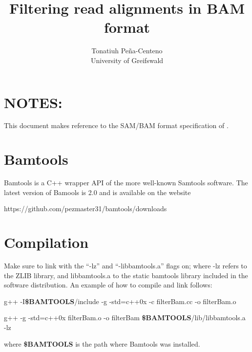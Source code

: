 \documentclass[11pt]{article}
\begin{document}
  
\title{Filtering read alignments in BAM format} 
\author{Tonatiuh Pe\~{n}a-Centeno \\
University of Greifswald}
\renewcommand{\today}{15 November, 2011}
\maketitle
{}

\section{NOTES:} 
This document makes reference to the SAM/BAM format specification of \cite{heng09}.

\section{Bamtools}
Bamtools is a C++ wrapper API of the more well-known Samtools software. The latest version of Bamools 
is 2.0 and is available on the website 
	\begin{center}
		https://github.com/pezmaster31/bamtools/downloads
	\end{center}
\item 


\section{Compilation}
Make sure to link with the ``-lz'' and ``-libbamtools.a'' flags on; where -lz refers to the ZLIB library, 
and libbamtools.a to the static bamtools library included in the software distribution. An example of 
how to compile and link follows: 

\begin{enumerate}
\begin{flushleft}
	\item	
		g++ -I\textbf{\$BAMTOOLS}/include   -g   -std=c++0x  -c filterBam.cc -o filterBam.o \\
	\item	g++     -g -std=c++0x  filterBam.o -o filterBam \textbf{\$BAMTOOLS}/lib/libbamtools.a -lz  
\end{flushleft}
\end{enumerate}
\vphantom{Nothing}
where \textbf{\$BAMTOOLS} is the path where Bamtools was installed.
\end{document}
